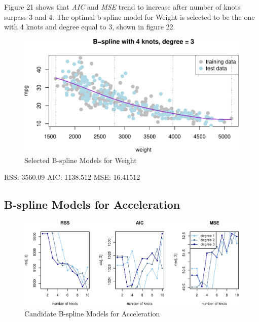 \documentclass[]{article}
\begin{document}
Figure 21 shows that \emph{AIC} and \emph{MSE} trend to increase after
number of knots surpass 3 and 4. The optimal b-spline model for Weight
is selected to be the one with 4 knots and degree equal to 3, shown in
figure 22.

\begin{figure}

{\centering \includegraphics{Report_files/figure-latex/bs-w-opt-1} 

}

\caption{Selected B-spline Models for Weight}\label{fig:bs-w-opt}
\end{figure}

RSS: 3560.09 AIC: 1138.512 MSE: 16.41512

\hypertarget{b-spline-models-for-acceleration}{%
\subsection{B-spline Models for
Acceleration}\label{b-spline-models-for-acceleration}}

\begin{figure}

{\centering \includegraphics{Report_files/figure-latex/bs-a-1} 

}

\caption{Candidate B-spline Models for Acceleration}\label{fig:bs-a}
\end{figure}
\end{document}
